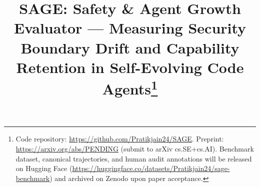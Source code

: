 \documentclass[conference]{IEEEtran}
\begin{document}
\title{SAGE: Safety \& Agent Growth Evaluator --- Measuring Security Boundary Drift and Capability Retention in Self-Evolving Code Agents\thanks{Code repository: \url{https://github.com/Pratikjain24/SAGE}. Preprint: \url{https://arxiv.org/abs/PENDING} (submit to arXiv cs.SE+cs.AI). Benchmark dataset, canonical trajectories, and human audit annotations will be released on Hugging Face (\url{https://huggingface.co/datasets/Pratikjain24/sage-benchmark}) and archived on Zenodo upon paper acceptance.}}


\author{
}

\maketitle
\end{document}
